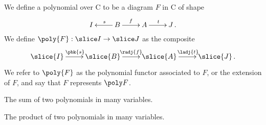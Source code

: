 \begin{def}
  We define a polynomial over C to be a diagram $F$ in C of shape
  \begin{equation}
  \lean{MvPoly}
  \label{equ:poly}
  \xymatrix{
  I  & B \ar[l]_s \ar[r]^f & A \ar[r]^t & J \, . }
  \end{equation}
  We define $\poly{F}:\slice I \to \slice J$ as the composite
  \[
  \xymatrix{
  \slice{I} \ar[r]^{\pbk{s}} & \slice{B} \ar[r]^{\radj{f}} & \slice{A} \ar[r]^{\ladj{t}} & \slice{J} \, . }
  \]
  We refer to $\poly{F}$ as the polynomial functor associated to $F$, or
  the extension of $F$, and say that $F$ represents $\poly F$.
\end{def}

\begin{def}
The sum of two polynomials in many variables.
\end{def}

\begin{def}
The product of two polynomials in many variables.
\end{def}

